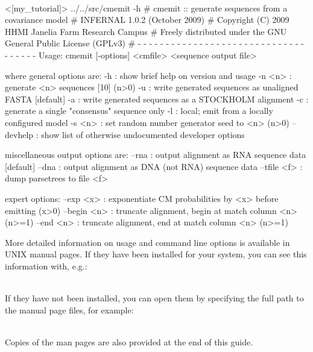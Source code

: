 \\

\begin{sreoutput}
<[my_tutorial]> ../../src/cmemit -h
# cmemit :: generate sequences from a covariance model
# INFERNAL 1.0.2 (October 2009)
# Copyright (C) 2009 HHMI Janelia Farm Research Campus
# Freely distributed under the GNU General Public License (GPLv3)
# - - - - - - - - - - - - - - - - - - - - - - - - - - - - - - - - - - - -
Usage: cmemit [-options] <cmfile> <sequence output file>

where general options are:
  -h        : show brief help on version and usage
  -n <n>    : generate <n> sequences  [10]  (n>0)
  -u        : write generated sequences as unaligned FASTA  [default]
  -a        : write generated sequences as a STOCKHOLM alignment
  -c        : generate a single "consensus" sequence only
  -l        : local; emit from a locally configured model
  -s <n>    : set random number generator seed to <n>  (n>0)
  --devhelp : show list of otherwise undocumented developer options

miscellaneous output options are:
  --rna       : output alignment as RNA sequence data  [default]
  --dna       : output alignment as DNA (not RNA) sequence data
  --tfile <f> : dump parsetrees to file <f>

expert options:
  --exp <x>   : exponentiate CM probabilities by <x> before emitting  (x>0)
  --begin <n> : truncate alignment, begin at match column <n>  (n>=1)
  --end <n>   : truncate alignment,   end at match column <n>  (n>=1)
\end{sreoutput}

More detailed information on usage and command line options is
available in UNIX manual pages. If they have been installed for your
system, you can see this information with, e.g.:

\\

If they have not been installed, you can open them by specifying the
full path to the manual page files, for example:

\\

Copies of the man pages are also provided at the end of this guide.


